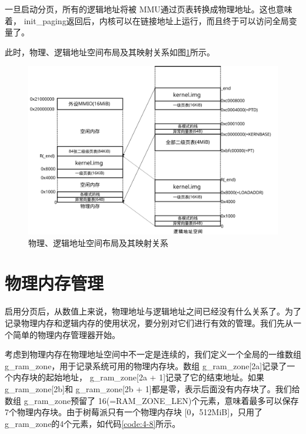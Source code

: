 \documentclass[main.tex]{subfiles}
\begin{document}
\begin{CJK*}{UTF8}{song}
\begin{code}
\label{code:4-7}
\inputminted[firstline=195,lastline=217,linenos,numbersep=5pt,frame=lines,framesep=2mm]{c}{src/chapter04/kernel/machdep.c}
\end{code}

\noindent
一旦启动分页，所有的逻辑地址将被 MMU通过页表转换成物理地址。这也意味着， init\_\-paging返回后，内核可以在链接地址上运行，而且终于可以访问全局变量了。

\par
此时，物理、逻辑地址空间布局及其映射关系如图\ref{figure:4-7}所示。

\begin{figure}[htp]
\centering
\includegraphics[scale=0.4]{figures/4-7}
\caption{物理、逻辑地址空间布局及其映射关系}
\label{figure:4-7}
\end{figure}

\section{物理内存管理}
启用分页后，从数值上来说，物理地址与逻辑地址之间已经没有什么关系了。为了记录物理内存和逻辑内存的使用状况，要分别对它们进行有效的管理。我们先从一个简单的物理内存管理器开始。

\par
考虑到物理内存在物理地址空间中不一定是连续的，我们定义一个全局的一维数组 g\_\-ram\_\-zone，用于记录系统可用的物理内存块。数组 g\_\-ram\_\-zone[2a]记录了一个内存块的起始地址， g\_\-ram\_\-zone[2a + 1]记录了它的结束地址。如果 g\_\-ram\_\-zone[2b]和 g\_\-ram\_\-zone[2b + 1]都是零，表示后面没有内存块了。我们给数组 g\_\-ram\_\-zone预留了 16(=RAM\_ZONE\_LEN)个元素，意味着最多可以保存7个物理内存块。由于树莓派只有一个物理内存块 [0，512\-MiB]，只用了 g\_\-ram\_\-zone的4个元素，如代码\ref{code:4-8}所示。


\end{CJK*}
\end{document}
